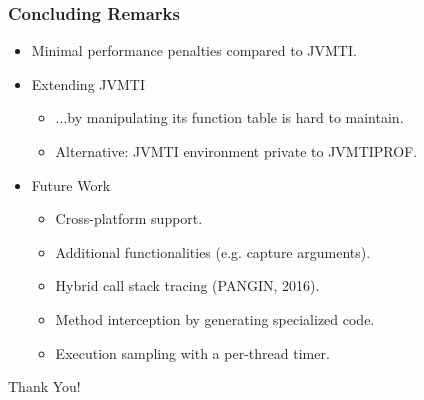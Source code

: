 \documentclass{beamer}
\begin{document}
\begin{frame}
\frametitle{Concluding Remarks}
\begin{itemize}
\item<1-> Minimal performance penalties compared to JVMTI.
\item<2-> Extending JVMTI
\begin{itemize}
\item ...by manipulating its function table is hard to maintain.
\item Alternative: JVMTI environment private to JVMTIPROF.
\end{itemize}
\item<3-> Future Work
\begin{itemize}
\item<3-> Cross-platform support.
\item<4-> Additional functionalities (e.g. capture arguments).
\item<5-> Hybrid call stack tracing (PANGIN, 2016).
\item<6-> Method interception by generating specialized code.
\item<7-> Execution sampling with a per-thread timer.
\end{itemize}
\end{itemize}
\end{frame}

\begin{frame}
\begin{center}
Thank You!
\end{center}
\end{frame}
\end{document}
